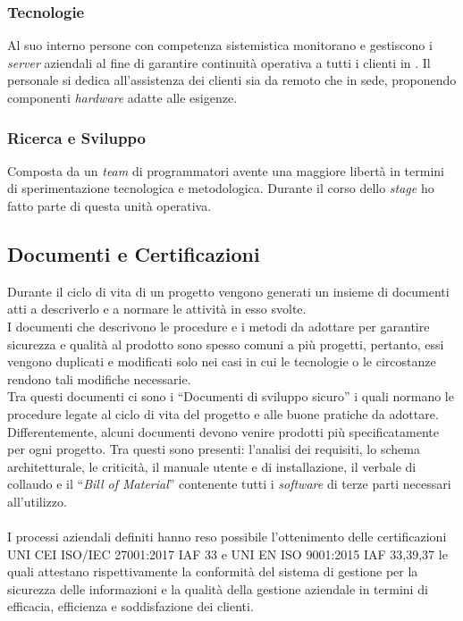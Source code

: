 \subsubsection*{Tecnologie}
Al suo interno persone con competenza sistemistica monitorano e gestiscono i \emph{server} aziendali al fine di garantire continuità operativa a tutti i clienti in . Il personale si dedica all'assistenza dei clienti sia da remoto che in sede, proponendo componenti \emph{hardware} adatte alle esigenze. 

\subsubsection*{Ricerca e Sviluppo}
Composta da un \emph{team} di programmatori avente una maggiore libertà in termini di sperimentazione tecnologica e metodologica. Durante il corso dello \emph{stage} ho fatto parte di questa \gls{unità operativa}. 

\subsection{Documenti e Certificazioni}
Durante il ciclo di vita di un progetto vengono generati un insieme di documenti atti a descriverlo e a normare le attività in esso svolte.\\
I documenti che descrivono le procedure e i metodi da adottare per garantire sicurezza e qualità al prodotto sono spesso comuni a più progetti, pertanto, essi vengono duplicati e modificati solo nei casi in cui le tecnologie o le circostanze rendono tali modifiche necessarie.\\
Tra questi documenti ci sono i “Documenti di sviluppo sicuro” i quali normano le procedure legate al ciclo di vita del progetto e alle buone pratiche da adottare.\\ 
Differentemente, alcuni documenti devono venire prodotti più specificatamente per ogni progetto. Tra questi sono presenti: l'analisi dei requisiti, lo schema architetturale, le criticità, il manuale utente e di installazione, il verbale di collaudo e il “\emph{Bill of Material}” contenente tutti i \emph{software} di terze parti necessari all'utilizzo.\\\\
I processi aziendali definiti hanno reso possibile l'ottenimento delle certificazioni UNI CEI ISO/IEC 27001:2017 IAF 33 e UNI EN ISO 9001:2015 IAF 33,39,37 le quali attestano rispettivamente la conformità del sistema di gestione per la sicurezza delle informazioni e la qualità della gestione aziendale in termini di efficacia, efficienza e soddisfazione dei clienti. 



